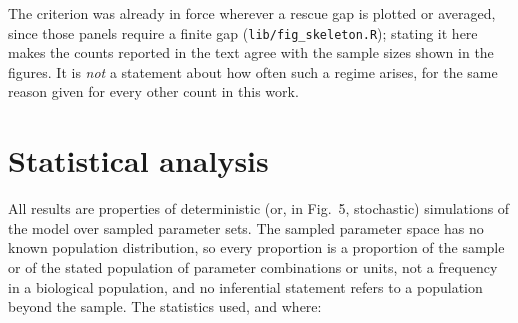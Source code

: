 \documentclass[11pt]{article}
\begin{document}
The criterion was already in force wherever a rescue gap is plotted or averaged, since
those panels require a finite gap (\texttt{lib/fig\_skeleton.R}); stating it here makes
the counts reported in the text agree with the sample sizes shown in the figures. It is
\emph{not} a statement about how often such a regime arises, for the same reason given
for every other count in this work.

\section{Statistical analysis}
\label{sec:stats}

All results are properties of deterministic (or, in Fig.~5, stochastic) simulations of
the model over sampled parameter sets. The sampled parameter space has no known
population distribution, so every proportion is a proportion of the sample or of the
stated population of parameter combinations or units, not a frequency in a biological
population, and no inferential statement refers to a population beyond the sample. The
statistics used, and where:
\end{document}
